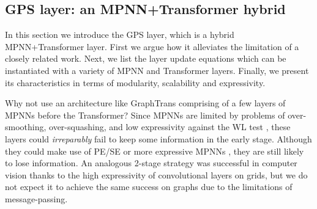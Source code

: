 \documentclass{article}
\begin{document}




\subsection{GPS layer: an MPNN+Transformer hybrid}\label{sec:gps_layer}

In this section we introduce the GPS layer, which is a hybrid MPNN+Transformer layer. First we argue how it alleviates the limitation of a closely related work. Next, we list the layer update equations which can be instantiated with a variety of MPNN and Transformer layers. Finally, we present its characteristics in terms of modularity, scalability and expressivity.



 Why not use an architecture like GraphTrans \cite{jain2021graphtrans} comprising of a few layers of MPNNs before the Transformer? Since MPNNs are limited by problems of over-smoothing, over-squashing, and low expressivity against the WL test \cite{alon2021on,topping2021understanding_ricci}, these layers could \textit{irreparably} fail to keep some information in the early stage. Although they could make use of PE/SE or more expressive MPNNs \cite{beaini2021directional_dgn, dwivedi2022LPE}, they are still likely to lose information. An analogous 2-stage strategy was successful in computer vision \cite{dascoli2021convit, guo2021cmt} thanks to the high expressivity of convolutional layers on grids, but we do not expect it to achieve the same success on graphs due to the limitations of message-passing.
\end{document}
